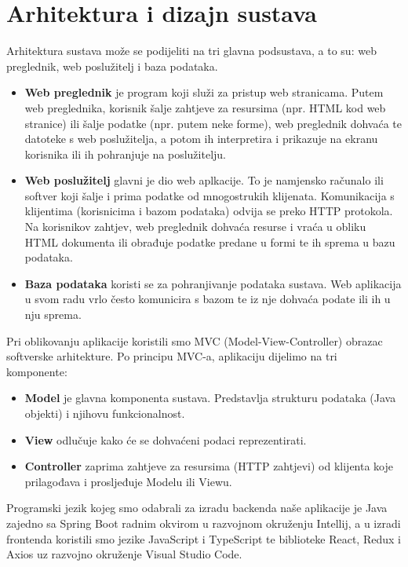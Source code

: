 \chapter{Arhitektura i dizajn sustava}
		\graphicspath{{./slike/}}
\noindent Arhitektura sustava može se podijeliti na tri glavna podsustava, a to su: web preglednik, web poslužitelj i baza podataka.

\begin{itemize}
	
	\item  \textbf{Web preglednik} je program koji služi za pristup web stranicama. Putem web preglednika, korisnik šalje zahtjeve za resursima (npr. HTML kod web stranice) ili šalje podatke (npr. putem neke forme), web preglednik dohvaća te datoteke s web poslužitelja, a potom ih interpretira i prikazuje na ekranu korisnika ili ih pohranjuje na poslužitelju. 
	
	\item \textbf{Web poslužitelj} glavni je dio web aplkacije. To je namjensko računalo ili softver koji šalje i prima podatke od mnogostrukih klijenata. Komunikacija s klijentima (korisnicima i bazom podataka) odvija se preko HTTP protokola. Na korisnikov zahtjev, web preglednik dohvaća resurse i vraća u obliku HTML dokumenta ili obrađuje podatke predane u formi te ih sprema u bazu podataka. 

	\item \textbf{Baza podataka} koristi se za pohranjivanje podataka sustava. Web aplikacija u svom radu vrlo često komunicira s bazom te iz nje dohvaća podate ili ih u nju sprema. 
\end{itemize}
Pri oblikovanju aplikacije koristili smo MVC (Model-View-Controller) obrazac softverske arhitekture.
Po principu MVC-a, aplikaciju dijelimo na tri komponente:	

\begin{itemize}
	
	\item \textbf{Model} je glavna komponenta sustava. Predstavlja strukturu podataka (Java objekti) i njihovu funkcionalnost.
	
	\item \textbf{View} odlučuje kako će se dohvaćeni podaci reprezentirati.
	
	\item \textbf{Controller}  zaprima zahtjeve za resursima (HTTP zahtjevi) od klijenta koje prilagođava i prosljeđuje Modelu ili Viewu. 
	
\end{itemize}
Programski jezik kojeg smo odabrali za izradu backenda naše aplikacije je Java zajedno sa Spring Boot radnim okvirom u razvojnom okruženju Intellij, a u izradi frontenda koristili smo jezike JavaScript i TypeScript te biblioteke React, Redux i Axios uz razvojno okruženje Visual Studio Code. 








